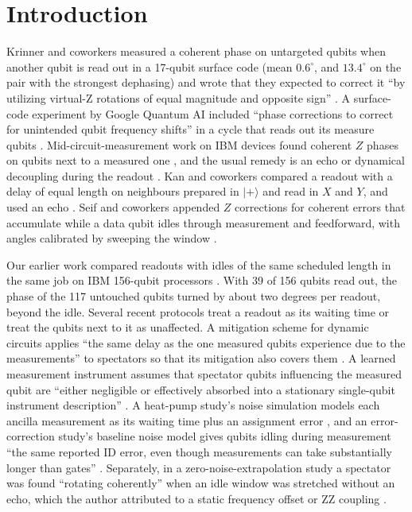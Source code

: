\documentclass[reprint,amsmath,amssymb,aps,superscriptaddress,nofootinbib]{revtex4-2}
\begin{document}
\section{Introduction}

Krinner and coworkers measured a coherent phase on untargeted qubits when another qubit is read out in a 17-qubit surface code (mean $0.6^\circ$, and $13.4^\circ$ on the pair with the strongest dephasing) and wrote that they expected to correct it ``by utilizing virtual-Z rotations of equal magnitude and opposite sign'' \cite{Krinner2022}. A surface-code experiment by Google Quantum AI included ``phase corrections to correct for unintended qubit frequency shifts'' in a cycle that reads out its measure qubits \cite{Google2023}. Mid-circuit-measurement work on IBM devices found coherent $Z$ phases on qubits next to a measured one \cite{Govia2023,Chen2022}, and the usual remedy is an echo or dynamical decoupling during the readout \cite{Shirizly2025,Chen2022,Bultink2020,Kan2026}. Kan and coworkers compared a readout with a delay of equal length on neighbours prepared in $|+\rangle$ and read in $X$ and $Y$, and used an echo \cite{Kan2026}. Seif and coworkers appended $Z$ corrections for coherent errors that accumulate while a data qubit idles through measurement and feedforward, with angles calibrated by sweeping the window \cite{Seif2024}.

Our earlier work compared readouts with idles of the same scheduled length in the same job on IBM 156-qubit processors \cite{readout}. With 39 of 156 qubits read out, the phase of the 117 untouched qubits turned by about two degrees per readout, beyond the idle. Several recent protocols treat a readout as its waiting time or treat the qubits next to it as unaffected. A mitigation scheme for dynamic circuits applies ``the same delay as the one measured qubits experience due to the measurements'' to spectators so that its mitigation also covers them \cite{SantosUzdin2025}. A learned measurement instrument assumes that spectator qubits influencing the measured qubit are ``either negligible or effectively absorbed into a stationary single-qubit instrument description'' \cite{Chu2026}. A heat-pump study's noise simulation models each ancilla measurement as its waiting time plus an assignment error \cite{Caselli2026}, and an error-correction study's baseline noise model gives qubits idling during measurement ``the same reported ID error, even though measurements can take substantially longer than gates'' \cite{McLauchlan2026}. Separately, in a zero-noise-extrapolation study a spectator was found ``rotating coherently'' when an idle window was stretched without an echo, which the author attributed to a static frequency offset or ZZ coupling \cite{Kumar2026}.
\end{document}
